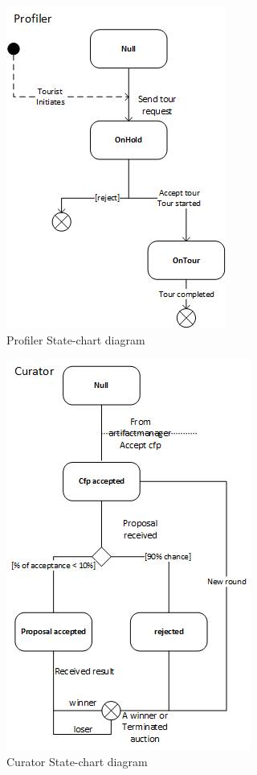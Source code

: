 \documentclass[a4paper, 11pt]{article}
\begin{document}
\begin{figure}[H]
	\caption{Profiler State-chart diagram}
	\centering
	\includegraphics[scale=0.9]{./images/profilerUML.jpg}
\end{figure}
\begin{figure}[H]
	\caption{Curator State-chart diagram}
	\centering
	\includegraphics[scale=0.9]{./images/curatorUML.jpg}
\end{figure}
\end{document}
